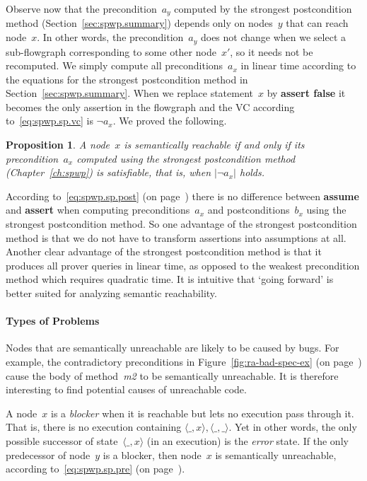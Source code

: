 \documentclass[a4paper]{article}
\theoremstyle{slanted}
\newtheorem{proposition}{Proposition}
\theoremstyle{definition}
\theoremstyle{remark}
\begin{document}
Observe now that the precondition~$a_y$ computed by the strongest
postcondition method (Section~\ref{sec:spwp.summary}) depends
only on nodes~$y$ that can reach node~$x$. In other words, the
precondition~$a_y$ does not change when we select a sub-flowgraph
corresponding to some other node~$x'$, so it needs not be
recomputed. We simply compute all preconditions~$a_x$ in
linear time according to the equations for the strongest
postcondition method in Section~\ref{sec:spwp.summary}. When
we replace statement~$x$ by \textbf{assert false} it becomes
the only assertion in the flowgraph and the VC according
to~\eqref{eq:spwp.sp.vc} is $\lnot a_x$. We proved the
following.

\begin{proposition}
A node~$x$ is semantically reachable if and only if its
precondition~$a_x$ computed using the strongest postcondition
method (Chapter~\ref{ch:spwp}) is satisfiable, that is, when
$|\lnot a_x|$ holds.
\end{proposition}

According to~\eqref{eq:spwp.sp.post} (on
page~\pageref{eq:spwp.sp.post}) there is no difference
between \textbf{assume} and \textbf{assert} when computing
preconditions~$a_x$ and postconditions~$b_x$ using the strongest
postcondition method. So one advantage of the strongest
postcondition method is that we do not have to transform
assertions into assumptions at all. Another clear advantage of
the strongest postcondition method is that it produces all prover
queries in linear time, as opposed to the weakest precondition
method which requires quadratic time. It is intuitive that `going
forward' is better suited for analyzing semantic reachability.

\paragraph{Types of Problems} 

Nodes that are semantically unreachable are likely
to be caused by bugs. For example, the contradictory
preconditions in Figure~\ref{fig:ra-bad-spec-ex} (on
page~\pageref{fig:ra-bad-spec-ex}) cause the body of
method~\textit{m2} to be semantically unreachable. It is
therefore interesting to find potential causes of unreachable
code.

A node~$x$ is a \emph{blocker} when it is reachable but lets
no execution pass through it. That is, there is no execution
containing $\langle\_,x\rangle,\langle\_,\_\rangle$. Yet in other
words, the only possible successor of state~$\langle\_,x\rangle$
(in an execution) is the \textit{error} state. If the only
predecessor of node~$y$ is a blocker, then node~$x$ is
semantically unreachable, according to~\eqref{eq:spwp.sp.pre} (on
page~\pageref{eq:spwp.sp.pre}).
\end{document}
